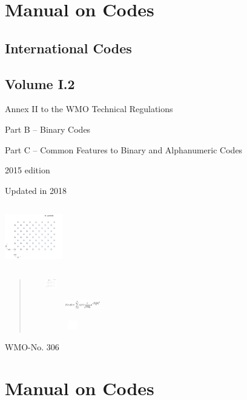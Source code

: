 \hypertarget{manual-on-codes}{%
\section{Manual on Codes}\label{manual-on-codes}}

\hypertarget{international-codes}{%
\subsection{International Codes }\label{international-codes}}

\hypertarget{volume-i.2}{%
\subsection{Volume I.2}\label{volume-i.2}}

Annex II to the WMO Technical Regulations

Part B -- Binary Codes

Part C -- Common Features to Binary and Alphanumeric Codes

2015 edition

Updated in 2018

\includegraphics[width=0.98958in,height=1.08403in]{../tex/extracted-media/media/image1.png}

\begin{quote}
\includegraphics[width=0.73958in,height=0.15417in]{../tex/extracted-media/media/image9.png}

\includegraphics[width=1.85in,height=0.16111in]{../tex/extracted-media/media/image15.png}

\includegraphics[width=1.49444in,height=0.16111in]{../tex/extracted-media/media/image27.png}
\end{quote}

WMO-No. 306

\hypertarget{manual-on-codes-1}{%
\section{Manual on Codes}\label{manual-on-codes-1}}

